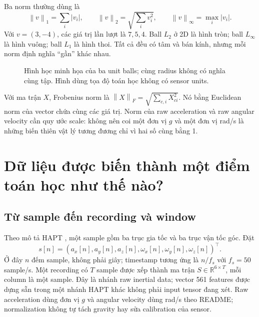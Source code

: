 \documentclass[11pt,a4paper]{article}
\newcommand{\R}{\mathbb R}
\newcommand{\norm}[1]{\left\lVert#1\right\rVert}
\theoremstyle{definition}
\begin{document}
Ba norm thường dùng là
\begin{equation}
\norm{v}_1=\sum_i|v_i|,\qquad
\norm{v}_2=\sqrt{\sum_i v_i^2},\qquad
\norm{v}_\infty=\max_i|v_i|.
\end{equation}
Với $v=(3,-4)$, các giá trị lần lượt là $7,5,4$. Ball $L_2$ ở 2D là hình
tròn; ball $L_\infty$ là hình vuông; ball $L_1$ là hình thoi. Tất cả đều
có tâm và bán kính, nhưng mỗi norm định nghĩa ``gần'' khác nhau.

\begin{figure}[!htbp]\centering
{}
\caption{Hình học minh họa của ba unit balls; cùng radius không có nghĩa
cùng tập. Hình dùng tọa độ toán học không có sensor units.}
\end{figure}

Với ma trận $X$, Frobenius norm là
$\norm{X}_F=\sqrt{\sum_{c,i}X_{ci}^2}$. Nó bằng Euclidean norm của vector
chứa cùng các giá trị. Norm của raw acceleration và raw angular velocity
cần quy ước scale: không nên coi một đơn vị $g$ và một đơn vị rad/s là
những biến thiên vật lý tương đương chỉ vì hai số cùng bằng 1.

\section{Dữ liệu được biến thành một điểm toán học như thế nào?}
\subsection{Từ sample đến recording và window}
Theo mô tả HAPT \cite{hapt}, một sample gồm ba trục gia tốc và ba trục vận
tốc góc. Đặt
\begin{equation}
s[n]=(a_x[n],a_y[n],a_z[n],\omega_x[n],\omega_y[n],\omega_z[n])^\top.
\end{equation}
Ở đây $n$ đếm sample, không phải giây; timestamp tương ứng là $n/f_s$ với
$f_s=50$ sample/s. Một recording có $T$ sample được xếp thành ma trận
$S\in\R^{6\times T}$, mỗi column là một sample. Đây là nhánh raw inertial
data; vector 561 features được dựng sẵn trong một nhánh HAPT khác không
phải input tensor đang xét. Raw acceleration dùng đơn vị $g$ và angular
velocity dùng rad/s theo README; normalization không tự tách gravity hay
sửa calibration của sensor.
\end{document}
